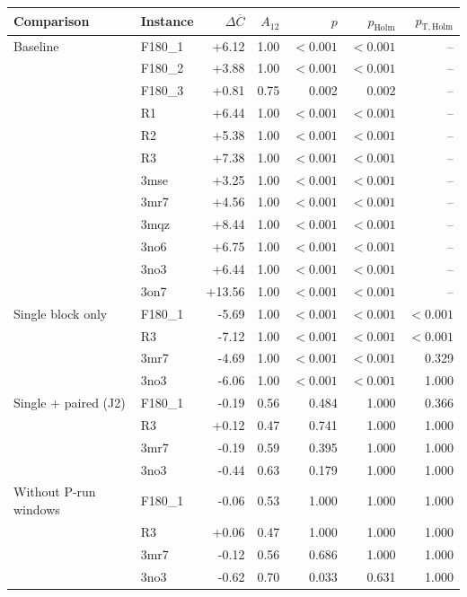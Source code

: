\begin{tabular}{@{}llrrrrr@{}}
\toprule
Comparison & Instance & $\Delta\overline C$ & $A_{12}$ & $p$ & $p_{\mathrm{Holm}}$ & $p_{\mathrm{T,Holm}}$ \\
\midrule
Baseline & F180\_1 & +6.12 & 1.00 & $<\!0.001$ & $<\!0.001$ & -- \\
 & F180\_2 & +3.88 & 1.00 & $<\!0.001$ & $<\!0.001$ & -- \\
 & F180\_3 & +0.81 & 0.75 & 0.002 & 0.002 & -- \\
 & R1 & +6.44 & 1.00 & $<\!0.001$ & $<\!0.001$ & -- \\
 & R2 & +5.38 & 1.00 & $<\!0.001$ & $<\!0.001$ & -- \\
 & R3 & +7.38 & 1.00 & $<\!0.001$ & $<\!0.001$ & -- \\
 & 3mse & +3.25 & 1.00 & $<\!0.001$ & $<\!0.001$ & -- \\
 & 3mr7 & +4.56 & 1.00 & $<\!0.001$ & $<\!0.001$ & -- \\
 & 3mqz & +8.44 & 1.00 & $<\!0.001$ & $<\!0.001$ & -- \\
 & 3no6 & +6.75 & 1.00 & $<\!0.001$ & $<\!0.001$ & -- \\
 & 3no3 & +6.44 & 1.00 & $<\!0.001$ & $<\!0.001$ & -- \\
 & 3on7 & +13.56 & 1.00 & $<\!0.001$ & $<\!0.001$ & -- \\
\addlinespace[2pt]
Single block only & F180\_1 & -5.69 & 1.00 & $<\!0.001$ & $<\!0.001$ & $<\!0.001$ \\
 & R3 & -7.12 & 1.00 & $<\!0.001$ & $<\!0.001$ & $<\!0.001$ \\
 & 3mr7 & -4.69 & 1.00 & $<\!0.001$ & $<\!0.001$ & 0.329 \\
 & 3no3 & -6.06 & 1.00 & $<\!0.001$ & $<\!0.001$ & 1.000 \\
\addlinespace[2pt]
Single + paired (J2) & F180\_1 & -0.19 & 0.56 & 0.484 & 1.000 & 0.366 \\
 & R3 & +0.12 & 0.47 & 0.741 & 1.000 & 1.000 \\
 & 3mr7 & -0.19 & 0.59 & 0.395 & 1.000 & 1.000 \\
 & 3no3 & -0.44 & 0.63 & 0.179 & 1.000 & 1.000 \\
\addlinespace[2pt]
Without P-run windows & F180\_1 & -0.06 & 0.53 & 1.000 & 1.000 & 1.000 \\
 & R3 & +0.06 & 0.47 & 1.000 & 1.000 & 1.000 \\
 & 3mr7 & -0.12 & 0.56 & 0.686 & 1.000 & 1.000 \\
 & 3no3 & -0.62 & 0.70 & 0.033 & 0.631 & 1.000 \\

\end{tabular}
